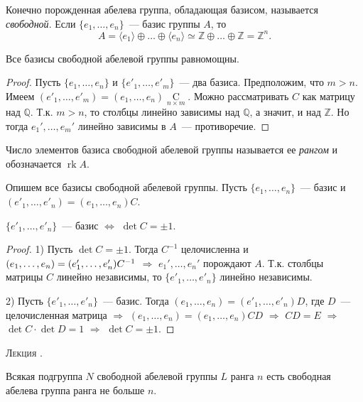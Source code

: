 \documentclass[a4paper]{article}
\newcounter{lec}
\renewcommand{\thelec}{\Roman{lec}}
\newcommand*{\lecture}[1]{\refstepcounter{lec}\vspace{20pt}
\begin{center}{\rmfamily\textsc{Лекция \thelec. \\ \textbf{#1}}}\vspace{5pt}
\end{center}}
\newcommand{\rk}{\mathop{\mathrm{rk}}\nolimits}
\newcommand*{\p}[1]{#1\nobreak\discretionary{}{\hbox{$\mathsurround=0pt #1$}}{}}
\begin{document}
Конечно порожденная абелева группа, обладающая базисом, называется
\emph{свободной}. Если $\{e_1,\ldots,e_n\}$~--- базис группы $A$, то
$$A=\langle e_1\rangle\oplus\ldots\oplus\langle e_n\rangle\simeq
\mathbb{Z}\oplus\ldots\oplus\mathbb{Z}=\mathbb{Z}^n.$$

\begin{theorem}
Все базисы свободной абелевой группы равномощны.
\end{theorem}

\begin{proof}
Пусть $\{e_1,\ldots,e_n\}$ и $\{e'_1,\ldots,e'_m\}$~--- два базиса.
Предположим, что $m>n$. Имеем
$(e'_1,\ldots,e'_m)=(e_1,\ldots,e_n)\mathop{C}\limits_{n\times m}$.
Можно рассматривать $C$ как матрицу над $\mathbb{Q}$. Т.к. $m>n$, то
столбцы линейно зависимы над $\mathbb{Q}$, а значит, и над
$\mathbb{Z}$. Но тогда $e_1',\ldots,e_m'$ линейно зависимы в $A$~---
противоречие.
\end{proof}

Число элементов базиса свободной абелевой группы называется ее
\emph{рангом} и обозначается $\rk A$.

Опишем все базисы свободной абелевой группы. Пусть $\{e_1,\ldots,
e_n\}$~--- базис и $(e'_1,\ldots, e'_n)=(e_1,\ldots,e_n)C$.

\begin{theorem}
$\{e'_1,\ldots, e'_n\}$~--- базис $\Leftrightarrow$ $\det C=\pm1$.
\end{theorem}

\begin{proof}
1) Пусть $\det C=\pm1$. Тогда $C^{-1}$ целочисленна и
$(e_1,\p\ldots, e_n)=(e'_1,\ldots,e'_n)C^{-1}$ $\Rightarrow$
$e_1',\ldots,e_n'$ порождают $A$. Т.к. столбцы матрицы $C$ линейно
независимы, то $\{e'_1,\ldots, e'_n\}$ линейно независимы.

2) Пусть $\{e'_1,\ldots, e'_n\}$~--- базис. Тогда $(e_1,\ldots,
e_n)=(e'_1,\ldots,e'_n)D$, где $D$~--- целочисленная матрица
$\Rightarrow$ $(e_1,\ldots, e_n)=(e_1,\ldots,e_n)CD$ $\Rightarrow$
$CD=E$ $\Rightarrow$ $\det C\cdot \det D=1$ $\Rightarrow$ $\det
C=\pm1$.
\end{proof}
\lecture{}

\begin{theorem}
\label{1.IV}Всякая подгруппа $N$ свободной абелевой группы $L$ ранга
$n$ есть свободная абелева группа ранга не больше $n$.
\end{theorem}
\end{document}
